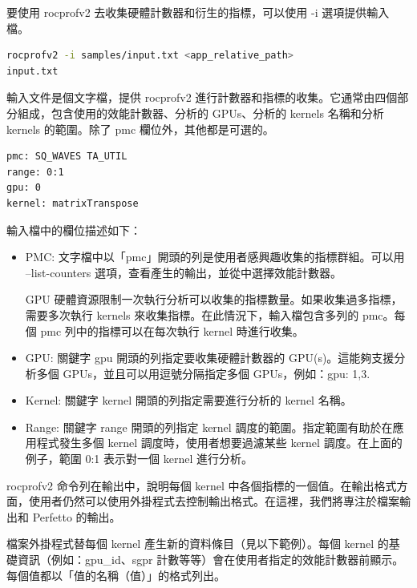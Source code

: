 要使用 rocprofv2 去收集硬體計數器和衍生的指標，可以使用 -i 選項提供輸入檔。

\begin{lstlisting}[language=bash, caption={使用rocprofv2分析kernel的命令}, label={lst:profile kernels with rocprofv2}]
rocprofv2 -i samples/input.txt <app_relative_path>
input.txt
\end{lstlisting}

輸入文件是個文字檔，提供 rocprofv2 進行計數器和指標的收集。它通常由四個部分組成，包含使用的效能計數器、分析的 GPUs、分析的 kernels 名稱和分析 kernels 的範圍。除了 pmc 欄位外，其他都是可選的。

\begin{lstlisting}[language=bash, caption={rocprofv2 kernel分析功能的輸入檔}, label={lst:Input file for kernel profiling feature of rocprofv2}]
pmc: SQ_WAVES TA_UTIL
range: 0:1
gpu: 0
kernel: matrixTranspose
\end{lstlisting}

輸入檔中的欄位描述如下：
\begin{itemize}
    \item PMC: 文字檔中以「pmc」開頭的列是使用者感興趣收集的指標群組。可以用 –list-counters 選項，查看產生的輸出，並從中選擇效能計數器。

    GPU 硬體資源限制一次執行分析可以收集的指標數量。如果收集過多指標，需要多次執行 kernels 來收集指標。在此情況下，輸入檔包含多列的 pmc。每個 pmc 列中的指標可以在每次執行 kernel 時進行收集。
    \item GPU: 關鍵字 gpu 開頭的列指定要收集硬體計數器的 GPU(s)。這能夠支援分析多個 GPUs，並且可以用逗號分隔指定多個 GPUs，例如：gpu: 1,3.
    \item Kernel: 關鍵字 kernel 開頭的列指定需要進行分析的 kernel 名稱。
    \item Range:  關鍵字 range 開頭的列指定 kernel 調度的範圍。指定範圍有助於在應用程式發生多個 kernel 調度時，使用者想要過濾某些 kernel 調度。在上面的例子，範圍 0:1 表示對一個 kernel 進行分析。
\end{itemize}

rocprofv2 命令列在輸出中，說明每個 kernel 中各個指標的一個值。在輸出格式方面，使用者仍然可以使用外掛程式去控制輸出格式。在這裡，我們將專注於檔案輸出和 Perfetto 的輸出。

檔案外掛程式替每個 kernel 產生新的資料條目（見以下範例）。每個 kernel 的基礎資訊（例如：gpu\_id、sgpr 計數等等）會在使用者指定的效能計數器前顯示。每個值都以「值的名稱（值）」的格式列出。

